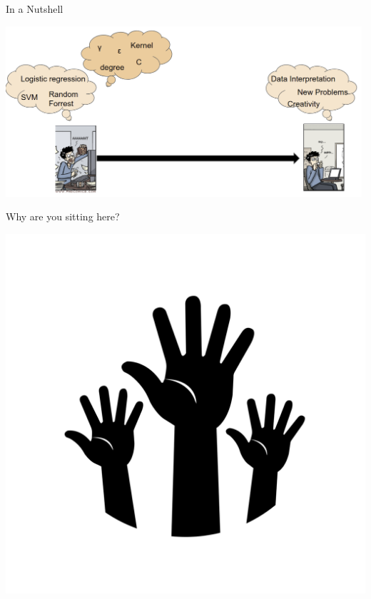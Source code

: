 \begin{frame}[c]{In a Nutshell}

\includegraphics[width=0.99\textwidth]{images/automl_comic}

\end{frame}
\begin{frame}[c]{}

\huge
\centering
Why are you sitting here?

\bigskip

\includegraphics[scale=0.1]{images/hands.png}

\end{frame}
